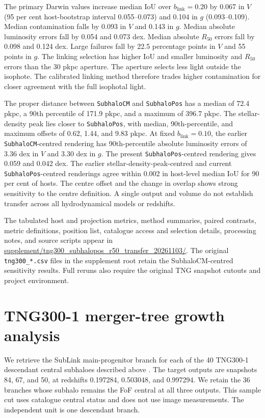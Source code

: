 \documentclass[usenatbib]{mnras}
\begin{document}
The primary Darwin values increase median IoU over $b_{\mathrm{link}}=0.20$
by 0.067 in $V$ (95 per cent host-bootstrap interval 0.055--0.073) and
0.104 in $g$ (0.093--0.109). Median contamination falls by 0.093 in $V$
and 0.143 in $g$. Median absolute luminosity errors fall by 0.054 and
0.073 dex. Median absolute $R_{50}$ errors fall by 0.098 and 0.124 dex.
Large failures fall by 22.5 percentage points in $V$ and 55 points in $g$.
The linking selection has higher IoU and smaller luminosity and $R_{50}$
errors than the 30 pkpc aperture. The aperture selects less light outside
the isophote. The calibrated linking method therefore trades higher
contamination for closer agreement with the full isophotal light.

The proper distance between \texttt{SubhaloCM} and \texttt{SubhaloPos} has
a median of 72.4 pkpc, a 90th percentile of 171.9 pkpc, and a maximum of
396.7 pkpc. The stellar-density peak lies closer to \texttt{SubhaloPos},
with median, 90th-percentile, and maximum offsets of 0.62, 1.44, and
9.83 pkpc. At fixed $b_{\mathrm{link}}=0.10$, the earlier
\texttt{SubhaloCM}-centred rendering has 90th-percentile absolute
luminosity errors of 3.36 dex in $V$ and 3.30 dex in $g$. The present
\texttt{SubhaloPos}-centred rendering gives 0.059 and 0.042 dex. The earlier
stellar-density-peak-centred and current \texttt{SubhaloPos}-centred
renderings agree within 0.002 in host-level median IoU for 90 per cent of
hosts. The centre offset and the change in overlap shows strong sensitivity to
the centre definition. A single output and volume do not establish transfer
across all hydrodynamical models or redshifts.

The tabulated host and projection metrics, method summaries, paired
contrasts, metric definitions, position list, catalogue access and selection details, processing notes,
and source scripts appear in
\url{supplement/tng300_subhalopos_r50_transfer_20261103/}. The
original \texttt{tng300\_*.csv} files in the supplement root retain the
SubhaloCM-centred sensitivity results. Full reruns also require the original
TNG snapshot cutouts and project environment.

\section{TNG300-1 merger-tree growth analysis}
\label{sec:tng-growth-methods}

We retrieve the SubLink main-progenitor branch for each of the 40 TNG300-1
descendant central subhaloes described above \citep{rodriguezgomez2015}.
The target outputs are snapshots 84, 67, and 50, at redshifts 0.197284,
0.503048, and 0.997294. We retain the 36 branches whose subhalo remains
the FoF central at all three outputs. This sample cut uses catalogue
central status and does not use image measurements. The independent unit
is one descendant branch.
\end{document}
